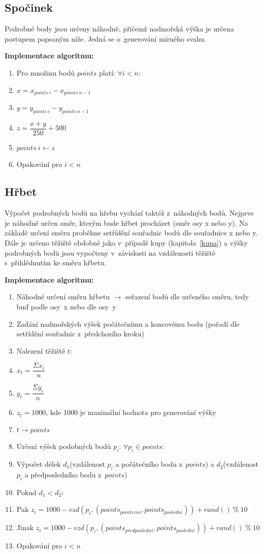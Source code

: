 \documentclass[a4paper, 12pt, oneside, titlepage]{article} %
\begin{document}
\subsection{Spočinek}
Podrobné body jsou určeny náhodně, přičemž nadmořská výška je určena postupem popsaným níže. Jedná se o~generování mírného svahu.

\textbf{Implementace algoritmu:}
\begin{enumerate}
\item Pro množinu bodů $points$ platí: $\forall i<n$:
\item \quad $x=x_{points~i}-x_{points~n-1}$
\item \quad $y=y_{points~i}-y_{points~n-1}$
\item \quad $z=\dfrac{x+y}{250}+500$
\item \quad $points~i \leftarrow z$
\item Opakování pro $i<n$
\end{enumerate}

\subsection{Hřbet}\label{hrbet}
Výpočet podrobných bodů na hřebu vychází taktéž z~náhodných bodů. Nejprve je náhodně určen směr, kterým bude hřbet procházet (směr osy x nebo y). Na základě určení směru proběhne setřídění souřadnic bodů dle souřadnice x nebo y. Dále je určeno těžiště obdobně jako v~případě kupy (kapitola~\ref{kupa}) a výšky podrobných bodů jsou vypočteny v~závislosti na vzdálenosti těžiště s~přihlédnutím ke směru hřbetu.

\textbf{Implementace algoritmu:}
\begin{enumerate}
\item Náhodné určení směru hřbetu $\rightarrow$ seřazení bodů dle určeného směru, tedy buď podle osy~x nebo dle osy~y
\item Zadání nadmořských výšek počátečnímu a koncovému bodu (pořadí dle setřídění souřadnic z~předchozího kroku)
\item Nalezení těžiště $t$:
\item \quad $x_t= \dfrac{\Sigma x_i}{n}$ 
\item \quad $y_t= \dfrac{\Sigma y_i}{n}$
\item \quad $z_t= 1000$, kde 1000 je maximální hodnota pro generování výšky
\item $t \rightarrow points$
\item Určení výšek podobných bodů $p_i$: $\forall p_i \in points $:
\item \quad Výpočet délek $d_1$(vzdálenost $p_i$ a počátečního bodu z~$points$) a $d_2$(vzdálenost $p_i$ a předposledního bodu z~$points$) 
\item \quad Pokud $d_1<d_2$:
\item \quad \quad Pak $z_i=1000-vzd(p_i,(points_{pocatecni},points_{posledni}))+rand()~\%~10$
\item \quad \quad Jinak $z_i=1000-vzd(p_i,(points_{predposledni},points_{posledni}))+rand()~\%~10$
\item Opakování pro $i<n$
\end{enumerate}
\end{document}
